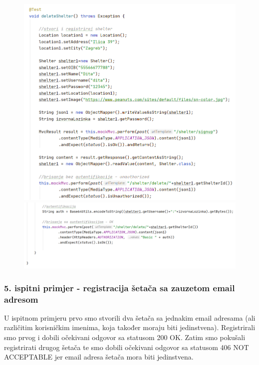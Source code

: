 			\begin{figure}[H]
				\hspace*{-0.93in}
				\includegraphics[scale=0.71]{slike/shelter4.1.PNG}
				\hspace*{-0.6in}
				\includegraphics[scale=0.71]{slike/shelter4.2.PNG} %
				\centering
			\end{figure}
			
			
			
			\subsubsection{5. ispitni primjer - registracija šetača sa zauzetom email adresom}
			
			U ispitnom primjeru prvo smo stvorili dva šetača sa jednakim email adresama (ali različitim korisničkim imenima, koja također moraju biti jedinstvena). Registrirali smo prvog i dobili očekivani odgovor sa statusom 200 OK. Zatim smo pokušali registrirati drugog šetača te smo dobili  očekivani odgovor sa statusom 406 NOT ACCEPTABLE jer email adresa šetača mora biti jedinstvena.
			
